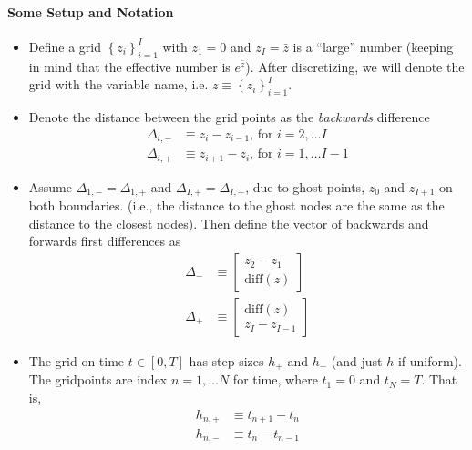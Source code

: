 \documentclass[11pt]{article}
\newcommand{\set}[1]{\ensuremath{\left\{{#1}\right\}}}
\begin{document}
\paragraph{Some Setup and Notation}
\begin{itemize}
	\item Define a  grid $\set{z_i}_{i=1}^I$ with $z_1 = 0$ and $z_I = \bar{z}$ is a ``large'' number (keeping in mind that the effective number is $e^{\bar{z}}$).  After discretizing, we will denote the grid with the variable name, i.e. $z \equiv \set{z_i}_{i=1}^I$.
	\item Denote the distance between the grid points as the \textit{backwards} difference
	\begin{align}
			\Delta_{i,-} &\equiv z_i - z_{i-1},\, \text{for } i = 2,\ldots I\\
			\Delta_{i,+} &\equiv z_{i+1} - z_i,\, \text{for } i = 1,\ldots I-1
	\end{align}
	\item Assume $\Delta_{1, -} = \Delta_{1, +}$ and $\Delta_{I, +} = \Delta_{I, -}$, due to ghost points, $z_0$ and $z_{I+1}$ on both boundaries. (i.e., the distance to the ghost nodes are the same as the distance to the closest nodes).  Then define the vector of backwards and forwards first differences as
	\begin{align}
		\Delta_{-} &\equiv \begin{bmatrix} z_2 - z_1 \\
			\text{diff}(z)
		\end{bmatrix}\\
		\Delta_{+} &\equiv \begin{bmatrix} \text{diff}(z)\\
			z_I - z_{I-1}
		\end{bmatrix}
	\end{align}
	\item The grid on time $t \in [0,T]$ has step sizes $h_{+}$ and $h_{-}$ (and just $h$ if uniform). The gridpoints are index $n=1,\ldots N$ for time, where $t_1 = 0$ and $t_N = T$.  That is,
	\begin{align}
	h_{n,+} &\equiv t_{n+1} - t_n\label{eq:h-i-plus}\\
	h_{n,-} &\equiv t_n - t_{n-1}\label{eq:h-i-minus}	
	\end{align}  
	

\end{itemize}
\end{document}
